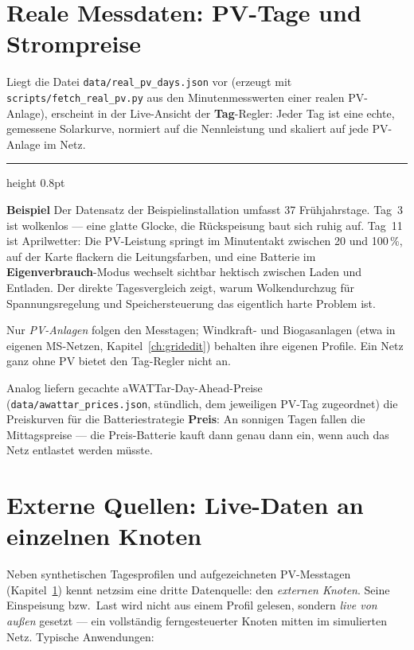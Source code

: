 \documentclass[11pt,a4paper,parskip=half]{scrreprt}
\newcommand{\ui}[1]{\textsf{\bfseries #1}}          %
\newenvironment{beispiel}[1][Beispiel]
  {\par\medskip
   {\color{bsp}\hrule height 0.8pt}\nopagebreak\smallskip
   \noindent\textbf{\textsf{\textcolor{bsp}{#1}}}\quad\ignorespaces}
  {\par\nopagebreak\smallskip{\color{bsp}\hrule height 0.8pt}\par\medskip}
\begin{document}
\chapter{Reale Messdaten: PV-Tage und Strompreise}
\label{ch:realpv}

Liegt die Datei \texttt{data/real\_pv\_days.json} vor (erzeugt mit
\texttt{scripts/fetch\_real\_pv.py} aus den Minutenmesswerten einer
realen PV-Anlage), erscheint in der Live-Ansicht der
\ui{Tag}-Regler: Jeder Tag ist eine echte, gemessene Solarkurve,
normiert auf die Nennleistung und skaliert auf jede PV-Anlage im
Netz.

\begin{beispiel}
Der Datensatz der Beispielinstallation umfasst 37 Frühjahrstage.
Tag~3 ist wolkenlos --- eine glatte Glocke, die Rückspeisung baut
sich ruhig auf. Tag~11 ist Aprilwetter: Die PV-Leistung springt im
Minutentakt zwischen 20 und 100\,\%, auf der Karte flackern die
Leitungsfarben, und eine Batterie im \ui{Eigenverbrauch}-Modus
wechselt sichtbar hektisch zwischen Laden und Entladen. Der direkte
Tagesvergleich zeigt, warum Wolkendurchzug für Spannungsregelung
und Speichersteuerung das eigentlich harte Problem ist.
\end{beispiel}

Nur \emph{PV-Anlagen} folgen den Messtagen; Windkraft- und
Biogasanlagen (etwa in eigenen MS-Netzen, Kapitel~\ref{ch:gridedit})
behalten ihre eigenen Profile. Ein Netz ganz ohne PV bietet den
Tag-Regler nicht an.

Analog liefern gecachte aWATTar-Day-Ahead-Preise
(\texttt{data/awattar\_prices.json}, stündlich, dem jeweiligen
PV-Tag zugeordnet) die Preiskurven für die Batteriestrategie
\ui{Preis}: An sonnigen Tagen fallen die Mittagspreise --- die
Preis-Batterie kauft dann genau dann ein, wenn auch das Netz
entlastet werden müsste.

\chapter{Externe Quellen: Live-Daten an einzelnen Knoten}
\label{ch:extern}

Neben synthetischen Tagesprofilen und aufgezeichneten PV-Messtagen
(Kapitel~\ref{ch:realpv}) kennt netzsim eine dritte Datenquelle: den
\emph{externen Knoten}. Seine Einspeisung bzw.\ Last wird nicht aus
einem Profil gelesen, sondern \emph{live von außen} gesetzt --- ein
vollständig ferngesteuerter Knoten mitten im simulierten Netz.
Typische Anwendungen:
\end{document}
